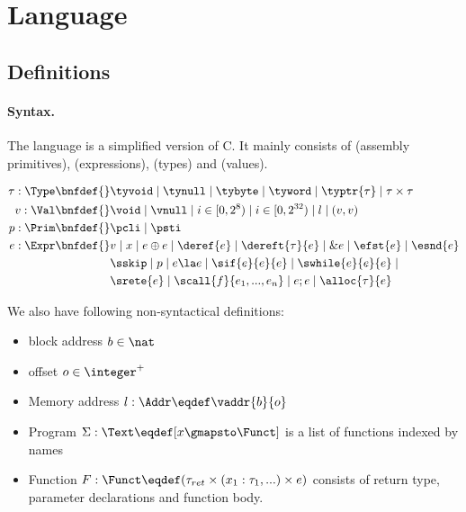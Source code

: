 \section{Language}
\label{sec:language}

\subsection{Definitions}

\paragraph{Syntax.}\label{p:type}

The language is a simplified version of C. It mainly consists of \Prim{} (assembly primitives),
\Expr{} (expressions), \Type{} (types) and \Val{} (values).

\begin{align*}
    \tau : \Type \bnfdef{}&
        \tyvoid \mid \tynull \mid \tybyte \mid \tyword \mid \typtr{\tau} \mid \tau \times \tau
\\
    v : \Val \bnfdef{}&
        \void \mid \vnull \mid i \in [0, 2^8) \mid i \in [0, 2^{32}) \mid l \mid (v, v)
\\
    p : \Prim \bnfdef{}&
        \pcli \mid \psti
\\
    e : \Expr \bnfdef{}&
       v \mid x \mid e \oplus e \mid \deref{e} \mid \dereft{\tau}{e} \mid \& e \mid \efst{e} \mid \esnd{e} \\&
       \sskip \mid p \mid e \la e \mid \sif{e}{e}{e} \mid \swhile{e}{e}{e} \mid \\&
       \srete{e} \mid \scall{f}{e_1, ..., e_n} \mid e ; e \mid \alloc{\tau}{e}
\\
\end{align*}

We also have following non-syntactical definitions:

\begin{itemize}
  \item block address $b \in \nat$
  \item offset $o \in \integer^{+}$
  \item Memory address $l: \Addr \eqdef \vaddr{b}{o}$
  \item Program $\Sigma: \Text \eqdef [x \gmapsto \Funct]$ is a list of functions indexed by names
  \item Function $F: \Funct \eqdef (\tau_{ret} \times (x_1 : \tau_1, ...) \times e)$ consists of return type,
    parameter declarations and function body.
\end{itemize}

